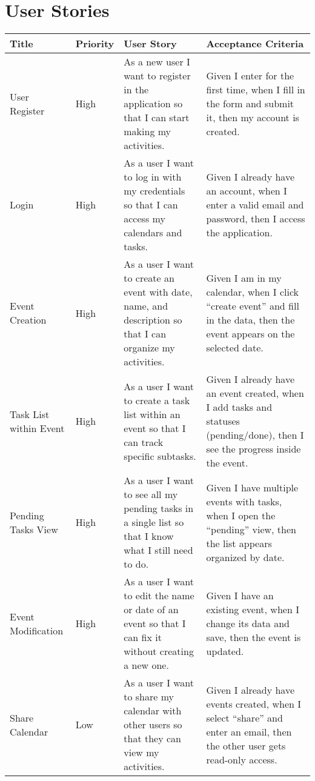 \documentclass[man]{apa7}
\begin{document}
\section{User Stories}
\begin{longtable}{|p{3cm}|p{2cm}|p{5cm}|p{5cm}|}
\hline
\textbf{Title} & \textbf{Priority} & \textbf{User Story} & \textbf{Acceptance Criteria} \\
\hline
User Register & High & As a new user I want to register in the application so that I can start making my activities. & Given I enter for the first time, when I fill in the form and submit it, then my account is created. \\
\hline
Login & High & As a user I want to log in with my credentials so that I can access my calendars and tasks. & Given I already have an account, when I enter a valid email and password, then I access the application. \\
\hline
Event Creation & High & As a user I want to create an event with date, name, and description so that I can organize my activities. & Given I am in my calendar, when I click “create event” and fill in the data, then the event appears on the selected date. \\
\hline
Task List within Event & High & As a user I want to create a task list within an event so that I can track specific subtasks. & Given I already have an event created, when I add tasks and statuses (pending/done), then I see the progress inside the event. \\
\hline
Pending Tasks View & High & As a user I want to see all my pending tasks in a single list so that I know what I still need to do. & Given I have multiple events with tasks, when I open the “pending” view, then the list appears organized by date. \\
\hline
Event Modification & High & As a user I want to edit the name or date of an event so that I can fix it without creating a new one. & Given I have an existing event, when I change its data and save, then the event is updated. \\
\hline
Share Calendar & Low & As a user I want to share my calendar with other users so that they can view my activities. & Given I already have events created, when I select “share” and enter an email, then the other user gets read-only access. \\
\hline
\end{longtable}
\end{document}
